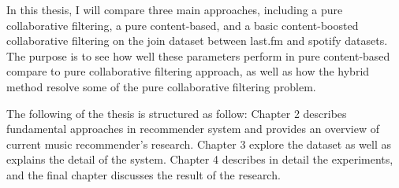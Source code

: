 In this thesis, I will compare three main approaches, including a pure collaborative filtering, a pure content-based, and a basic content-boosted collaborative filtering on the join dataset between last.fm and spotify datasets. The purpose is to see how well these parameters perform in pure content-based compare to pure collaborative filtering approach, as well as how the hybrid method resolve some of the pure collaborative filtering problem. 

The following of the thesis is structured as follow: Chapter 2 describes fundamental approaches in recommender system and provides an overview of current music recommender's research. Chapter 3 explore the dataset as well as explains the detail of the system. Chapter 4 describes in detail the experiments, and the final chapter discusses the result of the research. 




